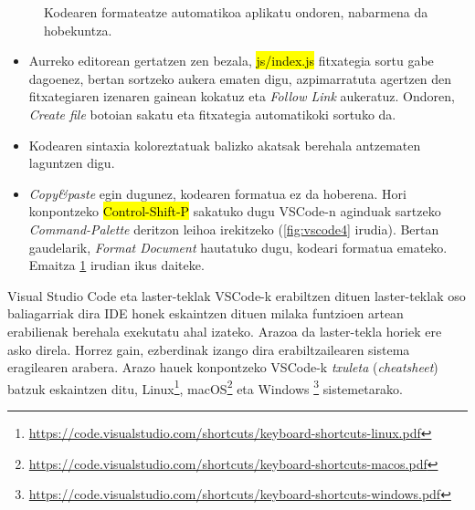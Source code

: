 \begin{figure}[ht]
	\centering
{}
\caption{Kodearen formateatze automatikoa aplikatu ondoren, nabarmena da hobekuntza.}
\label{fig:vscode6}
\end{figure}

\begin{itemize}
    \item Aurreko editorean gertatzen zen bezala, \hl{js/index.js} fitxategia sortu gabe dagoenez, bertan sortzeko aukera ematen digu, azpimarratuta agertzen den fitxategiaren izenaren gainean kokatuz eta \textquotedbl{}\textit{Follow Link}\textquotedbl{} aukeratuz. Ondoren, \textquotedbl{}\textit{Create file}\textquotedbl{} botoian sakatu eta fitxategia automatikoki sortuko da.
    
    \item Kodearen sintaxia koloreztatuak balizko akatsak berehala antzematen laguntzen digu.
    
    \item \textit{Copy\&paste} egin dugunez, kodearen formatua ez da hoberena. Hori konpontzeko \hl{Control-Shift-P} sakatuko dugu VSCode-n aginduak sartzeko \newline \textit{Command-Palette} deritzon leihoa irekitzeko (\ref{fig:vscode4} irudia). Bertan gaudelarik, \textquotedbl{}\textit{Format Document}\textquotedbl{} hautatuko dugu, kodeari formatua emateko. Emaitza \ref{fig:vscode6} irudian ikus daiteke.    
\end{itemize}

\begin{alertinfo}{Visual Studio Code eta laster-teklak}
VSCode-k erabiltzen dituen laster-teklak oso baliagarriak dira IDE honek eskaintzen dituen milaka funtzioen artean erabilienak berehala exekutatu ahal izateko. Arazoa da laster-tekla horiek ere asko direla. Horrez gain, ezberdinak izango dira erabiltzailearen sistema eragilearen arabera. Arazo hauek konpontzeko VSCode-k \textit{txuleta} (\textit{cheatsheet}) batzuk eskaintzen ditu, Linux\footnote{\href{https://code.visualstudio.com/shortcuts/keyboard-shortcuts-linux.pdf}{https://code.visualstudio.com/shortcuts/keyboard-shortcuts-linux.pdf}}, macOS\footnote{\href{https://code.visualstudio.com/shortcuts/keyboard-shortcuts-macos.pdf}{https://code.visualstudio.com/shortcuts/keyboard-shortcuts-macos.pdf}} eta Windows  \footnote{\href{https://code.visualstudio.com/shortcuts/keyboard-shortcuts-windows.pdf}{https://code.visualstudio.com/shortcuts/keyboard-shortcuts-windows.pdf}} sistemetarako.

\end{alertinfo}


